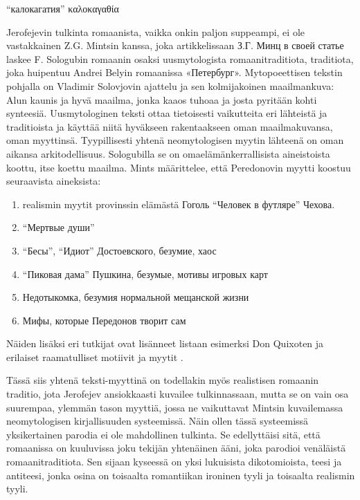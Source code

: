 \documentclass[12pt,a4paper]{article}
\begin{document}
\enquote{калокагатия} \foreignlanguage{greek}{καλοκαγαθία}



Jerofejevin tulkinta romaanista, vaikka onkin paljon suppeampi, ei ole vastakkainen Z.G. Mintsin kanssa, joka artikkelissaan
З.Г. Минц в своей статье  laskee F. Sologubin romaanin osaksi uusmytologista romaanitraditiota, traditiota, joka huipentuu Andrei Belyin romaanissa «Петербург». Mytopoeettisen tekstin pohjalla on Vladimir Solovjovin ajattelu ja sen kolmijakoinen maailmankuva: Alun kaunis ja hyvä maailma, jonka kaaos tuhoaa ja josta pyritään kohti synteesiä. Uusmytologinen teksti ottaa tietoisesti vaikutteita eri lähteistä ja traditioista ja käyttää niitä hyväkseen rakentaakseen oman maailmakuvansa, oman myyttinsä.  Tyypillisesti yhtenä neomytologisen myytin lähteenä on oman aikansa arkitodellisuus. Sologubilla se on omaelämänkerrallisista aineistoista koottu, itse koettu maailma. Mints määrittelee, että Peredonovin myytti koostuu seuraavista aineksista:


\begin{enumerate}[itemsep=0mm, label=\asbuk*)]
\item realismin myytit provinssin elämästä Гоголь \enquote{Человек в футляре} Чехова.
\item \enquote{Мертвые души}
\item \enquote{Бесы}, \enquote{Идиот} Достоевского, безумие, хаос
\item \enquote{Пиковая дама} Пушкина, безумые, мотивы игровых карт
\item Недотыкомка, безумия нормальной мещанской жизни
\item Мифы, которые Передонов творит сам
\end{enumerate}

Näiden lisäksi eri tutkijat ovat lisänneet listaan esimerksi Don Quixoten \parencite{bagno2009} ja erilaiset raamatulliset motiivit ja myytit \parencite{kobrinski2013}.

Tässä siis yhtenä teksti-myyttinä on todellakin myös realistisen romaanin traditio, jota Jerofejev ansiokkaasti kuvailee tulkinnassaan, mutta se on vain osa suurempaa, ylemmän tason myyttiä, jossa ne vaikuttavat Mintsin kuvailemassa neomytologisen kirjallisuuden systeemissä. Näin ollen tässä systeemissä yksikertainen parodia ei ole mahdollinen tulkinta. Se edellyttäisi sitä, että romaanissa on kuuluvissa joku tekijän yhtenäinen ääni, joka parodioi venäläistä romaanitraditiota. Sen sijaan kyseessä on yksi lukuisista dikotomioista, teesi ja antiteesi, jonka osina on toisaalta romantiikan ironinen tyyli ja toisaalta realismin tyyli. 
\end{document}
